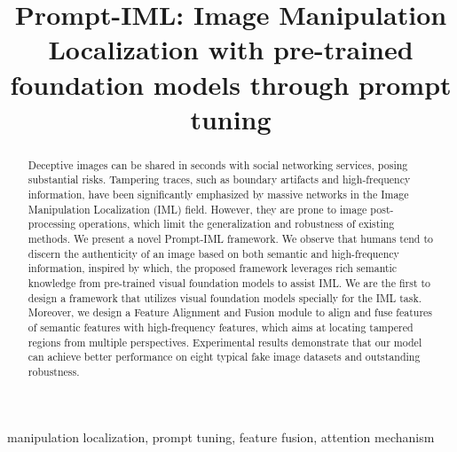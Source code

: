 \documentclass{article}
\begin{document}
\sloppy

\def\x{{\mathbf x}}
\def\L{{\cal L}}


\title{Prompt-IML: Image Manipulation Localization with pre-trained foundation models through prompt tuning}
%

\address{School of Computer Science, Fudan University, China\\
\{22210240093@m., 22110240074@m., qcying20@, zxqian@, zhangxinpeng@, lisheng@\}fudan.edu.cn\\
}


\maketitle


%
\begin{abstract}
Deceptive images can be shared in seconds with social networking services, posing substantial risks. Tampering traces, such as boundary artifacts and high-frequency information, have been significantly emphasized by massive networks in the Image Manipulation Localization (IML) field. However, they are prone to image post-processing operations, which limit the generalization and robustness of existing methods. 
We present a novel Prompt-IML framework. We observe that humans tend to discern the authenticity of an image based on both semantic and high-frequency information, inspired by which, the proposed framework leverages rich semantic knowledge from pre-trained visual foundation models to assist IML.
We are the first to design a framework that utilizes visual foundation models specially for the IML task.
Moreover, we design a Feature Alignment and Fusion module to align and fuse features of semantic features with high-frequency features, which aims at locating tampered regions from multiple perspectives.  Experimental results demonstrate that our model can achieve better performance on eight typical fake image datasets and outstanding robustness.
\end{abstract}
%
\begin{keywords}
manipulation localization, prompt tuning, feature fusion, attention mechanism
\end{keywords}
%
\end{document}
